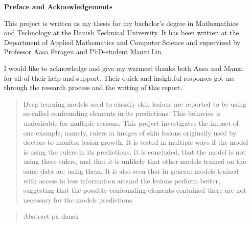 \begin{center}
\vspace*{\fill}
\begin{large}
    \textbf{Preface and Acknowledgements}
\end{large}

This project is written as my thesis for my bachelor's degree in Mathemathics and Technology at
the Danish Technical University.
It has been written at the Department of Applied Mathematics and Computer Science and supervised by
Professor Aasa Feragen and PhD-student Manxi Lin. 

I would like to acknowledge and give my warmest thanks both Aasa and Manxi for all of their help and support.
Their quick and insightful responses got me through the research process and the writing of this report.



\end{center}
\vspace*{\fill}
\pagebreak
\vspace*{\fill}
\begin{abstract}
Deep learning models used to classify skin lesions are reported
to be using so-called confounding elements in its predictions.
This behavior is undesirable for multiple reasons. 
This project investigates the impact of one example,
namely, rulers in images of skin lesions originally used by 
doctors to monitor lesion growth.
It is tested in multiple ways if the model is using the rulers in
its predictions.
It is concluded, that the model is not using these rulers,
and that it is unlikely that other models trained on the same data
are using them.
It is also seen that in general models trained with access to less
information around the lesions perform better, suggesting that
the possibly confounding elements contained there are not necessary
for the models predictions.

\end{abstract}
\vspace*{\fill}
\begin{abstract}
Abstract på dansk
\end{abstract}
\vspace*{\fill}
